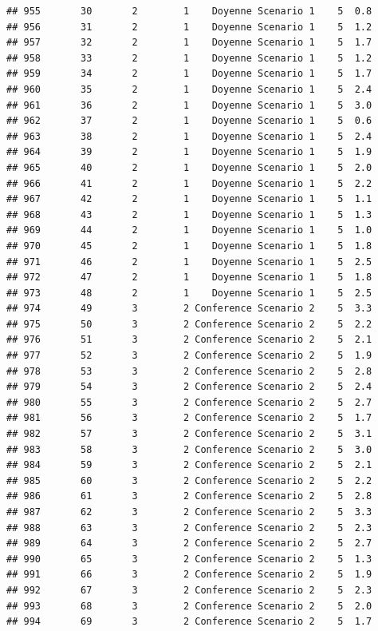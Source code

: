 \documentclass[
]{article}
\begin{document}
\begin{verbatim}
## 955       30       2        1    Doyenne Scenario 1    5  0.8
## 956       31       2        1    Doyenne Scenario 1    5  1.2
## 957       32       2        1    Doyenne Scenario 1    5  1.7
## 958       33       2        1    Doyenne Scenario 1    5  1.2
## 959       34       2        1    Doyenne Scenario 1    5  1.7
## 960       35       2        1    Doyenne Scenario 1    5  2.4
## 961       36       2        1    Doyenne Scenario 1    5  3.0
## 962       37       2        1    Doyenne Scenario 1    5  0.6
## 963       38       2        1    Doyenne Scenario 1    5  2.4
## 964       39       2        1    Doyenne Scenario 1    5  1.9
## 965       40       2        1    Doyenne Scenario 1    5  2.0
## 966       41       2        1    Doyenne Scenario 1    5  2.2
## 967       42       2        1    Doyenne Scenario 1    5  1.1
## 968       43       2        1    Doyenne Scenario 1    5  1.3
## 969       44       2        1    Doyenne Scenario 1    5  1.0
## 970       45       2        1    Doyenne Scenario 1    5  1.8
## 971       46       2        1    Doyenne Scenario 1    5  2.5
## 972       47       2        1    Doyenne Scenario 1    5  1.8
## 973       48       2        1    Doyenne Scenario 1    5  2.5
## 974       49       3        2 Conference Scenario 2    5  3.3
## 975       50       3        2 Conference Scenario 2    5  2.2
## 976       51       3        2 Conference Scenario 2    5  2.1
## 977       52       3        2 Conference Scenario 2    5  1.9
## 978       53       3        2 Conference Scenario 2    5  2.8
## 979       54       3        2 Conference Scenario 2    5  2.4
## 980       55       3        2 Conference Scenario 2    5  2.7
## 981       56       3        2 Conference Scenario 2    5  1.7
## 982       57       3        2 Conference Scenario 2    5  3.1
## 983       58       3        2 Conference Scenario 2    5  3.0
## 984       59       3        2 Conference Scenario 2    5  2.1
## 985       60       3        2 Conference Scenario 2    5  2.2
## 986       61       3        2 Conference Scenario 2    5  2.8
## 987       62       3        2 Conference Scenario 2    5  3.3
## 988       63       3        2 Conference Scenario 2    5  2.3
## 989       64       3        2 Conference Scenario 2    5  2.7
## 990       65       3        2 Conference Scenario 2    5  1.3
## 991       66       3        2 Conference Scenario 2    5  1.9
## 992       67       3        2 Conference Scenario 2    5  2.3
## 993       68       3        2 Conference Scenario 2    5  2.0
## 994       69       3        2 Conference Scenario 2    5  1.7

\end{verbatim}
\end{document}
